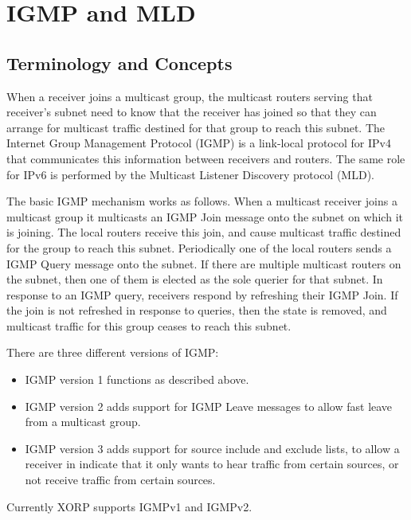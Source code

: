 %
%

\chapter{IGMP and MLD}
\label{igmp}

\section{Terminology and Concepts}

When a receiver joins a multicast group, the multicast routers serving
that receiver's subnet need to know that the receiver has joined so
that they can arrange for multicast traffic destined for that group to
reach this subnet.  The Internet Group Management Protocol (IGMP) is
a link-local protocol for IPv4 that communicates this information
between receivers and routers.  The same role for IPv6 is performed by
the Multicast Listener Discovery protocol (MLD).

The basic IGMP mechanism works as follows.  When a multicast receiver
joins a multicast group it multicasts an IGMP Join message onto the
subnet on which it is joining.  The local routers receive this join,
and cause multicast traffic destined for the group to reach this
subnet.  Periodically one of the local routers sends a IGMP Query
message onto the subnet.  If there are multiple multicast routers on
the subnet, then one of them is elected as the sole querier for that
subnet.  In response to an IGMP query, receivers respond by refreshing
their IGMP Join.  If the join is not refreshed in response to queries,
then the state is removed, and multicast traffic for this group ceases
to reach this subnet.

There are three different versions of IGMP:
\begin{itemize}
\item IGMP version 1 functions as described above.
\item IGMP version 2 adds support for IGMP Leave messages to allow
  fast leave from a multicast group.
\item IGMP version 3 adds support for source include and exclude
  lists, to allow a receiver in indicate that it only wants to hear
  traffic from certain sources, or not receive traffic from certain
  sources.
\end{itemize}

Currently XORP supports IGMPv1 and IGMPv2.

